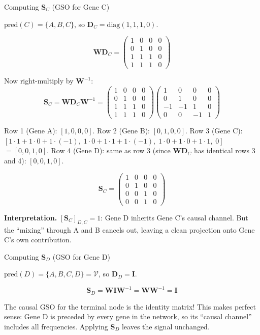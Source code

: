 \begin{examplebox}{Computing $\mathbf{S}_C$ (GSO for Gene C)}

$\text{pred}(C) = \{A, B, C\}$, so $\mathbf{D}_C = \text{diag}(1, 1, 1, 0)$.

\[
    \mathbf{W}\mathbf{D}_C = \begin{pmatrix}1&0&0&0\\0&1&0&0\\1&1&1&0\\1&1&1&0\end{pmatrix}
\]

Now right-multiply by $\mathbf{W}^{-1}$:
\[
    \mathbf{S}_C = \mathbf{W}\mathbf{D}_C \mathbf{W}^{-1}
    = \begin{pmatrix}1&0&0&0\\0&1&0&0\\1&1&1&0\\1&1&1&0\end{pmatrix}
    \begin{pmatrix}1&0&0&0\\0&1&0&0\\-1&-1&1&0\\0&0&-1&1\end{pmatrix}
\]

Row 1 (Gene A): $[1, 0, 0, 0]$.
Row 2 (Gene B): $[0, 1, 0, 0]$.
Row 3 (Gene C): $[1\cdot1 + 1\cdot0 + 1\cdot(-1),\; 1\cdot0 + 1\cdot1 + 1\cdot(-1),\; 1\cdot0+1\cdot0+1\cdot1,\; 0]$
$= [0, 0, 1, 0]$.
Row 4 (Gene D): same as row 3 (since $\mathbf{W}\mathbf{D}_C$ has identical
rows 3 and 4): $[0, 0, 1, 0]$.

\[
    \mathbf{S}_C = \begin{pmatrix}1&0&0&0\\0&1&0&0\\0&0&1&0\\0&0&1&0\end{pmatrix}
\]

\textbf{Interpretation.} $[\mathbf{S}_C]_{D,C} = 1$: Gene D inherits Gene C's
causal channel. But the ``mixing'' through A and B cancels out, leaving a clean
projection onto Gene C's own contribution.
\end{examplebox}

\begin{examplebox}{Computing $\mathbf{S}_D$ (GSO for Gene D)}

$\text{pred}(D) = \{A, B, C, D\} = \mathcal{V}$, so $\mathbf{D}_D = \mathbf{I}$.

\[
    \mathbf{S}_D = \mathbf{W} \mathbf{I} \mathbf{W}^{-1} = \mathbf{W}\mathbf{W}^{-1} = \mathbf{I}
\]

The causal GSO for the terminal node is the identity matrix! This makes perfect
sense: Gene D is preceded by every gene in the network, so its ``causal
channel'' includes all frequencies. Applying $\mathbf{S}_D$ leaves the signal
unchanged.
\end{examplebox}

